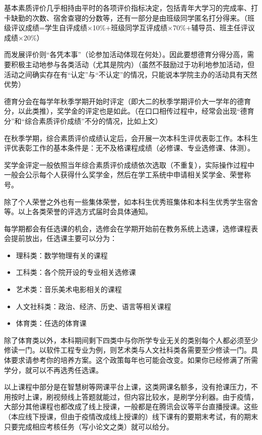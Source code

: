 基本素质评价几乎相持由平时的各项评价指标决定，包括青年大学习的完成率、打卡缺勤的次数、宿舍查寝的分数等，还有一部分是由班级同学匿名打分得来。（班级评议成绩=学生自评成绩×10\%+班级同学互评成绩×70\%+辅导员、班主任评议成绩×20\%）

而发展评价则“各凭本事”（论参加活动体现在何处）。因此要想德育分得分高，需要积极主动地参与各类活动（尤其是院内）（虽然不鼓励过于功利地参加活动，但活动之间确实存在有“认定”与“不认定”的情况，只能说本学院主办的活动具有天然优势）

德育分会在每学年秋季学期开始时评定（即大二的秋季学期评价大一学年的德育分，以此类推），奖学金的评定也是如此。（在口口相传过程中，经常会出现“德育分”和“综合素质评价成绩”不分的情况，比如上文）


在秋季学期，综合素质评价成绩认定后，会开展一次本科生评优表彰工作。本科生评优表彰工作的基本条件是：无不及格课程成绩（必修课、专业选修课、体测）。

奖学金评定一般依照当年综合素质评价成绩依次选取（不重复），实际操作过程中一般会公示每个人获得什么奖学金，然后在学工系统中申请相关奖学金、荣誉称号。


除了个人荣誉之外也有一些集体荣誉，如本科生优秀班集体和本科生优秀学生宿舍等。以上各类荣誉的评选方式届时会具体通知。


每学期都会有任选课的机会，选修会在学期开始前在教务系统上选课，选修课程表会提前放出，任选课主要可以分为：
\begin{itemize}
    \kaishu
    \item 理科类：数学物理有关的课程
    \item 工科类：各个院开设的专业相关选修课
    \item 艺术类：音乐美术电影相关的课程
    \item 人文社科类：政治、经济、历史、语言等相关课程
    \item 体育类：任选的体育课
\end{itemize}

除了体育类以外，本科期间剩下四类中与你所学专业无关的类别每个人都必须至少修读一门。以软件工程专业为例，则艺术类与人文社科类各需要至少修读一门。具体要求请参考你的培养方案。这个政策每年也可能会改变。如果你已经修满了所需学分，就可以不再选秀任选课。

以上课程中部分是在智慧树等网课平台上课，这类网课名额多，没有抢课压力，不用按时上课，刷视频线上答题就能过，但内容比较水，是刷学分利器。由于疫情，大部分其他课程也都改成了线上授课，一般都是在腾讯会议等平台直播授课。这些（本应线下授课，但由于疫情改成线上授课的）线下课有的要期末考试，有的期末只要完成相应考核任务（写小论文之类）就可以给分。


